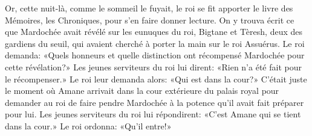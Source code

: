 Or, cette nuit-là, comme le sommeil le fuyait,
	le roi se fit apporter le livre des Mémoires, les Chroniques,
	pour s’en faire donner lecture.
On y trouva écrit ce que Mardochée avait révélé sur les eunuques du roi,
	Bigtane et Tèresh, deux des gardiens du seuil,
	qui avaient cherché à porter la main sur le roi Assuérus.
Le roi demanda: «Quels honneurs et quelle distinction
	ont récompensé Mardochée pour cette révélation?»
Les jeunes serviteurs du roi lui dirent: «Rien n’a été fait pour le récompenser.»
Le roi leur demanda alors:
	«Qui est dans la cour?»
C’était juste le moment où Amane arrivait dans la cour extérieure du palais royal
	pour demander au roi de faire pendre Mardochée
		à la potence qu’il avait fait préparer pour lui.
Les jeunes serviteurs du roi lui répondirent: «C’est Amane qui se tient dans la cour.»
Le roi ordonna: «Qu’il entre!»
